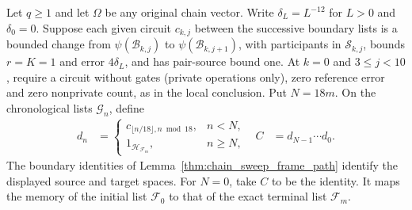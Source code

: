\begin{definition}
    \label{def:chain_conditional_middle_circuit}
    \leanok
    Let $q\ge1$ and let $\Omega$ be any original chain vector.
    Write $\delta_L=L^{-12}$ for $L>0$ and $\delta_0=0$.
    Suppose each given circuit $c_{k,j}$ between the successive
    boundary lists is a bounded change from $\psi(\mathcal B_{k,j})$ to
    $\psi(\mathcal B_{k,j+1})$, with participants in $\mathcal S_{k,j}$,
    bounds $r=K=1$ and error $4\delta_L$, and has pair-source bound one.
    At $k=0$ and $3\le j<10$, require a circuit without gates (private
    operations only), zero reference error and zero nonprivate count, as
    in the local conclusion.
    Put $N=18m$. On the chronological lists $\mathcal G_n$, define
    \begin{align}
        d_n & =
        \begin{cases}
            c_{\lfloor n/18\rfloor,n\bmod18}, & n<N,    \\
            1_{\mathcal H_{\mathcal F_m}},    & n\ge N,
        \end{cases}
            & C & =d_{N-1}\cdots d_0.
        \label{eq:chain_conditional_middle}
    \end{align}
    The boundary identities of Lemma~\ref{thm:chain_sweep_frame_path}
    identify the displayed source and target spaces. For $N=0$, take
    $C$ to be the identity. It maps the memory of the initial list
    $\mathcal F_0$ to that of the exact terminal list $\mathcal F_m$.
\end{definition}

